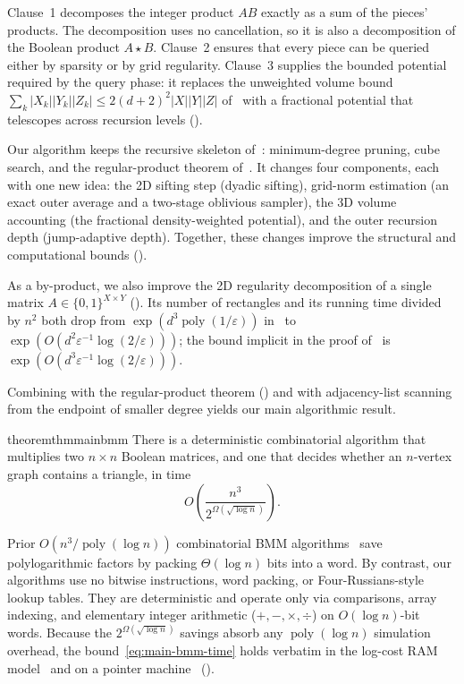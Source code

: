 \documentclass[11pt]{article}
\theoremstyle{definition}
\renewcommand{\label}[1]{}%
\newcommand{\poly}{\operatorname{poly}}
\newcommand{\abs}[1]{\left\lvert #1 \right\rvert}
\begin{document}
Clause~1 decomposes the integer product $AB$ exactly as a sum of the pieces' products. The decomposition uses no cancellation, so it is also a decomposition of the Boolean product $A \star B$. Clause~2 ensures that every piece can be queried either by sparsity or by grid regularity. Clause~3 supplies the bounded potential required by the query phase: it replaces the unweighted volume bound $\sum_k \abs{X_k}\abs{Y_k}\abs{Z_k} \le 2(d+2)^2\abs{X}\abs{Y}\abs{Z}$ of~\cite[Theorem~3.1]{AFKLM24} with a fractional potential that telescopes across recursion levels ().

Our algorithm keeps the recursive skeleton of~\cite{AFKLM24}: minimum-degree pruning, cube search, and the regular-product theorem of~\cite{KelleyLM23}. It changes four components, each with one new idea: the 2D sifting step (dyadic sifting), grid-norm estimation (an exact outer average and a two-stage oblivious sampler), the 3D volume accounting (the fractional density-weighted potential), and the outer recursion depth (jump-adaptive depth). Together, these changes improve the structural and computational bounds ().

As a by-product, we also improve the 2D regularity decomposition of a single matrix $A \in \{0, 1\}^{X \times Y}$ (). Its number of rectangles and its running time divided by $n^2$ both drop from $\exp(d^3\poly(1/\varepsilon))$ in~\cite[Theorem~3.3]{AFKLM24} to $\exp(O(d^2 \varepsilon^{-1}\log(2/\varepsilon)))$; the bound implicit in the proof of~\cite[Theorem~3.3]{AFKLM24} is $\exp(O(d^3 \varepsilon^{-1}\log(2/\varepsilon)))$.

Combining  with the regular-product theorem () and with adjacency-list scanning from the endpoint of smaller degree yields our main algorithmic result.

\begin{restatable}{theorem}{thmmainbmm}\label{thm:main-bmm}
There is a deterministic combinatorial algorithm that multiplies two $n \times n$ Boolean matrices, and one that decides whether an $n$-vertex graph contains a triangle, in time
\begin{equation}\label{eq:main-bmm-time}
    O\!\left(\frac{n^3}{2^{\Omega(\sqrt{\log n})}}\right).
\end{equation}
\end{restatable}

Prior $O(n^3 / \poly(\log n))$ combinatorial BMM algorithms~\cite{ADKF70,BansalW12,Chan15,Yu18} save polylogarithmic factors by packing $\Theta(\log n)$ bits into a word. By contrast, our algorithms use no bitwise instructions, word packing, or Four-Russians-style lookup tables. They are deterministic and operate only via comparisons, array indexing, and elementary integer arithmetic ($+, -, \times, \div$) on $O(\log n)$-bit words. Because the $2^{\Omega(\sqrt{\log n})}$ savings absorb any $\poly(\log n)$ simulation overhead, the bound~\eqref{eq:main-bmm-time} holds verbatim in the log-cost RAM model~\cite{CookR73} and on a pointer machine~\cite{Schonhage80,BenAmram95} ().
\end{document}
